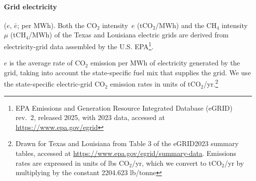 \documentclass[11pt]{article}
\newcommand{\cotwo}{\ensuremath{\mathrm{CO_2}}}
\newcommand{\chfour}{\ensuremath{\mathrm{CH_4}}}
\begin{document}
\paragraph{Grid electricity} ($e$, $\bar{e}$; per MWh).
Both the \cotwo{} intensity~$e$ (t\cotwo{}/MWh) and the \chfour{} intensity~$\mu$ (t\chfour{}/MWh) of the Texas and Louisiana electric grids are derived from electricity-grid data assembled by the U.S. EPA\footnote{EPA Emissions and Generation Resource Integrated Database (eGRID) rev.\ 2, released 2025, with 2023 data, accessed at \url{https://www.epa.gov/egrid}}.

$e$ is the average rate of \cotwo{} emission per MWh of electricity generated by the grid, taking into account the state-specific fuel mix that supplies the grid. We use the state-specific electric-grid \cotwo{} emission rates in units of t\cotwo{}/yr.\footnote{Drawn for Texas and Louisiana from Table 3 of the eGRID2023 summary tables, accessed at \url{https://www.epa.gov/egrid/summary-data}. Emissions rates are expressed in units of lbs \cotwo{}/yr, which we convert to t\cotwo{}/yr by multiplying by the constant 2204.623 lb/tonne}
\end{document}
